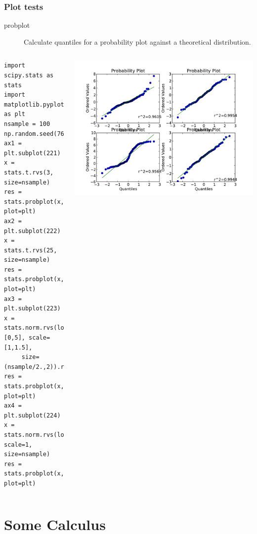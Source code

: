 \documentclass[10pt,colorlinks]{beamer}
\begin{document}
\begin{frame}[fragile]\frametitle{Plot tests}
  \begin{description}
      \item[probplot] Calculate quantiles for a probability plot against a theoretical distribution. 
  \end{description}
 \begin{columns}[c]
\tiny
\begin{verbatim}
import scipy.stats as stats
import matplotlib.pyplot as plt 
nsample = 100
np.random.seed(7654321)
ax1 = plt.subplot(221)
x = stats.t.rvs(3, size=nsample)
res = stats.probplot(x, plot=plt)
ax2 = plt.subplot(222)
x = stats.t.rvs(25, size=nsample)
res = stats.probplot(x, plot=plt)
ax3 = plt.subplot(223)
x = stats.norm.rvs(loc=[0,5], scale=[1,1.5],
     size=(nsample/2.,2)).ravel()
res = stats.probplot(x, plot=plt)
ax4 = plt.subplot(224)
x = stats.norm.rvs(loc=0, scale=1, size=nsample)
res = stats.probplot(x, plot=plt)
\end{verbatim}

\includegraphics[width=\textwidth]{plwfigis/CursP_3_figure23}

\end{columns}
\end{frame}

\section{Some Calculus} %
\label{sec:Some Calculus}
\end{document}

